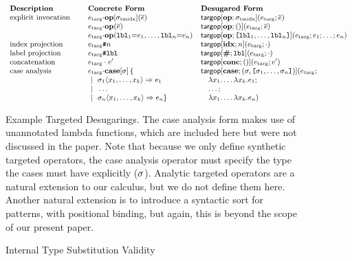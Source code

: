 \begin{figure}
$\small
\begin{array}{lll}
\textbf{Description}& \textbf{Concrete Form}~~~~ & \textbf{Desugared Form}\\
\text{explicit invocation}~~~~ & e_\text{targ}{\cdot}\opname{op}[\sttmidx](\es) & \etarg{\opname{op}}{\sttmidx}{e_\text{targ}}{\es}\\
& e_\text{targ}{\cdot}\opname{op}(\es) & \etarg{\opname{op}}{()}{e_\text{targ}}{\es}\\
& e_\text{targ}{\cdot}\opname{op}(\conclbl{lbl}_1{=}e_1, \ldots, \conclbl{lbl}_n{=}e_n) & \keyw{targop}[\opname{op}; \texttt{[}\conclbl{lbl}_1, \ldots, \conclbl{lbl}_n\texttt{]}](e_\text{targ}; e_1; \ldots; e_n)\\
\text{index projection} & e_\text{targ}\texttt{\#}n & \etarg{\opname{idx}}{n}{e_\text{targ}}{\cdot}\\
\text{label projection} & e_\text{targ}\texttt{\#}\conclbl{lbl} & \etarg{\opname{\#}}{\conclbl{lbl}}{e_\text{targ}}{\cdot}\\
\text{concatenation} & e_\text{targ}\cdot e' & \etarg{\opname{conc}}{()}{e_\text{targ}}{e'}\\
\text{case analysis} & e_\text{targ}{\cdot}\opname{case}[\st]\,\{ & \keyw{targop}[{\opname{case}}; (\st, {\texttt{[}\st_1, \ldots, \st_n\texttt{]}})]({e_\text{targ}}; \\
 & ~|~~\st_1\langle x_1, \ldots, x_k \rangle \Rightarrow e_1 & \quad \eanalam{x_1}{\ldots \eanalam{x_k}{e_1}};\\
 & ~|~~\ldots & \quad \ldots;\\ 
 & ~|~~\st_n\langle x_1, \ldots, x_k \rangle \Rightarrow e_n\} & \quad \eanalam{x_1}{\ldots \eanalam{x_k}{e_n}})
\end{array}
$
\caption[Example Targeted Desugarings]{Example Targeted Desugarings. The case analysis form makes use of unannotated lambda functions, which are included here but were not discussed in the paper. Note that because we only define synthetic targeted operators, the case analysis operator must specify the type the cases must have explicitly ($\st$). Analytic targeted operators are a natural extension to our calculus, but we do not define them here. Another natural extension is to introduce a syntactic sort for patterns, with positional binding, but again, this is beyond the scope of our present paper.}
\label{fig:example-targeted-desugarings}
\end{figure}
\clearpage

\begin{figure}[p]
\small\fbox{$\Delta \vdash \delta : \Delta$}\vspace{-25px}
\begin{mathpar}

\end{mathpar}
\caption{Internal Type Substitution Validity}
\label{fig:internal-type-substitution-validity}
\end{figure}


